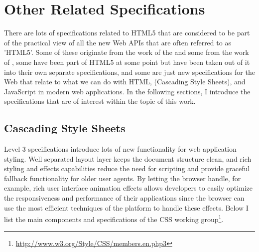 \chapter{Other Related Specifications}
\label{chapter:other-related-specifications}

There are lots of specifications related to HTML5 that are considered
to be part of the practical view of all the new Web APIs that are
often referred to as 'HTML5'. Some of these originate from the work of
the  and some from the work of , some have been
part of HTML5 at some point but have been taken out of it into their
own separate specifications, and some are just new specifications for
the Web that relate to what we can do with HTML,  (Cascading
Style Sheets), and JavaScript in modern web applications. In the
following sections, I introduce the specifications that are of
interest within the topic of this work.

\section{Cascading Style Sheets}
\label{section:css}

 Level 3 specifications introduce lots of new functionality
for web application styling. Well separated layout layer keeps the
document structure clean, and rich styling and effects capabilities
reduce the need for scripting and provide graceful fallback
functionality for older user agents. By letting the browser handle,
for example, rich user interface animation effects allows developers
to easily optimize the responsiveness and performance of their
applications since the browser can use the most efficient techniques
of the platform to handle these effects. Below I list the main
components and specifications of the  CSS working
group\footnote{\url{http://www.w3.org/Style/CSS/members.en.php3}}.

